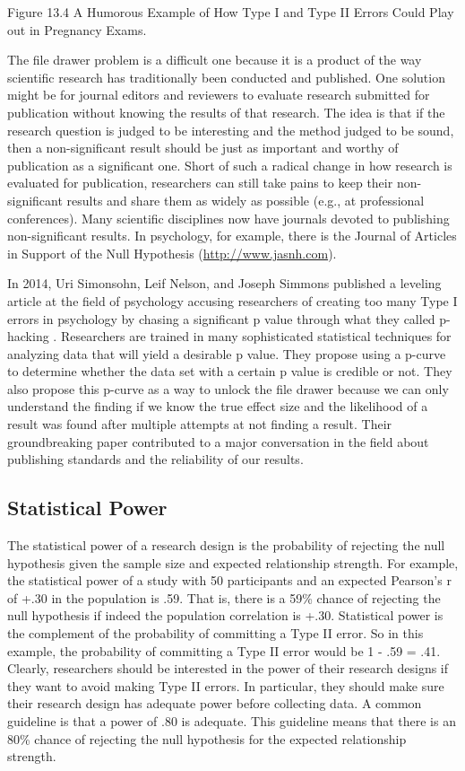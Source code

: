  

 
 Figure 13.4 A Humorous Example of How Type I and Type II Errors Could Play out in Pregnancy Exams.

 
The file drawer problem is a difficult one because it is a product of the way scientific research has traditionally been conducted and published. One solution might be for journal editors and reviewers to evaluate research submitted for publication without knowing the results of that research. The idea is that if the research question is judged to be interesting and the method judged to be sound, then a non-significant result should be just as important and worthy of publication as a significant one. Short of such a radical change in how research is evaluated for publication, researchers can still take pains to keep their non-significant results and share them as widely as possible (e.g., at professional conferences). Many scientific disciplines now have journals devoted to publishing non-significant results. In psychology, for example, there is the Journal of Articles in Support of the Null Hypothesis (\url{http://www.jasnh.com}).


In 2014, Uri Simonsohn, Leif Nelson, and Joseph Simmons published a leveling article at the field of psychology accusing researchers of creating too many Type I errors in psychology by chasing a significant p value through what they called p-hacking \citep{simonsohn_p-curve:_2014}. Researchers are trained in many sophisticated statistical techniques for analyzing data that will yield a desirable p value. They propose using a p-curve to determine whether the data set with a certain p value is credible or not. They also propose this p-curve as a way to unlock the file drawer because we can only understand the finding if we know the true effect size and the likelihood of a result was found after multiple attempts at not finding a result. Their groundbreaking paper contributed to a major conversation in the field about publishing standards and the reliability of our results.


\subsection{Statistical Power}

The statistical power of a research design is the probability of rejecting the null hypothesis given the sample size and expected relationship strength. For example, the statistical power of a study with 50 participants and an expected Pearson's r of +.30 in the population is .59. That is, there is a 59\% chance of rejecting the null hypothesis if indeed the population correlation is +.30. Statistical power is the complement of the probability of committing a Type II error. So in this example, the probability of committing a Type II error would be 1 - .59 = .41. Clearly, researchers should be interested in the power of their research designs if they want to avoid making Type II errors. In particular, they should make sure their research design has adequate power before collecting data. A common guideline is that a power of .80 is adequate. This guideline means that there is an 80\% chance of rejecting the null hypothesis for the expected relationship strength.


